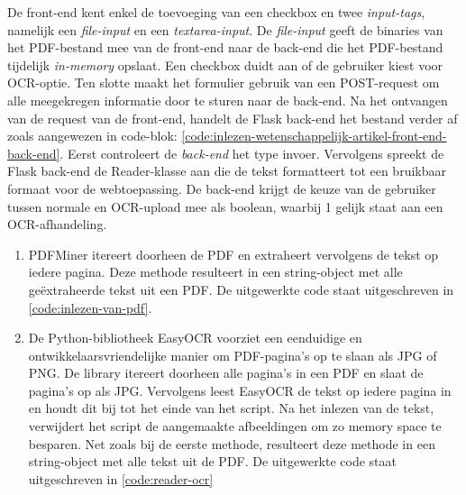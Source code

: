 De front-end kent enkel de toevoeging van een checkbox en twee \textit{input-tags}, namelijk een \textit{file-input} en een \textit{textarea-input}. De \textit{file-input} geeft de binaries van het PDF-bestand mee van de front-end naar de back-end die het PDF-bestand tijdelijk \textit{in-memory} opslaat. Een checkbox duidt aan of de gebruiker kiest voor OCR-optie. Ten slotte maakt het formulier gebruik van een POST-request om alle meegekregen informatie door te sturen naar de back-end. Na het ontvangen van de request van de front-end, handelt de Flask back-end het bestand verder af zoals aangewezen in code-blok: \ref{code:inlezen-wetenschappelijk-artikel-front-end-back-end}. Eerst controleert de \textit{back-end} het type invoer. Vervolgens spreekt de Flask back-end de Reader-klasse aan die de tekst formatteert tot een bruikbaar formaat voor de webtoepassing. De back-end krijgt de keuze van de gebruiker tussen normale en OCR-upload mee als boolean, waarbij 1 gelijk staat aan een OCR-afhandeling.

\begin{enumerate}
	\item PDFMiner itereert doorheen de PDF en extraheert vervolgens de tekst op iedere pagina. Deze methode resulteert in een string-object met alle geëxtraheerde tekst uit een PDF. De uitgewerkte code staat uitgeschreven in \ref{code:inlezen-van-pdf}.
	\item De Python-bibliotheek EasyOCR voorziet een eenduidige en ontwikkelaarsvriendelijke manier om PDF-pagina's op te slaan als JPG of PNG. De library itereert doorheen alle pagina's in een PDF en slaat de pagina's op als JPG. Vervolgens leest EasyOCR de tekst op iedere pagina in en houdt dit bij tot het einde van het script. Na het inlezen van de tekst, verwijdert het script de aangemaakte afbeeldingen om zo memory space te besparen. Net zoals bij de eerste methode, resulteert deze methode in een string-object met alle tekst uit de PDF. De uitgewerkte code staat uitgeschreven in \ref{code:reader-ocr}
\end{enumerate}

